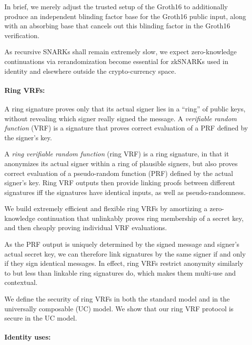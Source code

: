 In brief, we merely adjust the trusted setup of the Groth16 to additionally
produce an independent blinding factor base for the Groth16 public input, 
along with an absorbing base that cancels out this blinding factor in the
Groth16 verification.  

As recursive SNARKs shall remain extremely slow,
we expect zero-knowledge continuations via rerandomization become
essential for zkSNARKs used in identity and elsewhere outside the crypto-currency space.

\paragraph{Ring VRFs:}

A ring signature proves only that its actual signer lies in a ``ring''
of public keys, without revealing which signer really signed the message.
A {\it verifiable random function} (VRF) is a signature that proves
correct evaluation of a PRF defined by the signer's key.

A {\it ring verifiable random function} (ring VRF) is a ring signature, in
that it anonymizes its actual signer within a ring of plausible signers,
but also proves correct evaluation of a pseudo-random function (PRF)
defined by the actual signer's key. %
%
Ring VRF outputs then provide linking proofs between different signatures
iff the signatures have identical inputs, as well as pseudo-randomness.

We build extremely efficient and flexible ring VRFs by amortizing a
zero-knowledge continuation that unlinkably proves ring membership
of a secret key, and then cheaply proving individual VRF evaluations.

As the PRF output is uniquely determined by the signed message and
signer's actual secret key, we can therefore link signatures by the
same signer if and only if they sign identical messages.
In effect, ring VRFs restrict anonymity similarly to but less than
 linkable ring signatures do, which makes them multi-use and contextual.

We define the security of ring VRFs in both the standard model
and in the universally composable (UC) \cite{canetti1,canetti2} model. 
We show that our ring VRF protocol is secure in the UC model.

\paragraph{Identity uses:}

